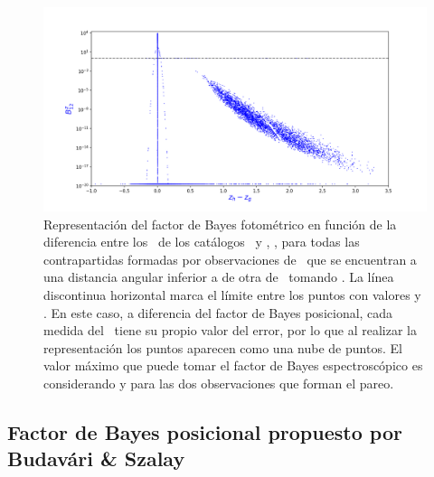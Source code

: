 \begin{figure}[H]
    \begin{center}
         \includegraphics[width=\textwidth]{4_cross_identificacion/matching_ghbayes_zmatching_gh.png}
    \end{center}
    \vspace*{-10mm}
    \caption{\small Representación del factor de Bayes fotométrico en función de la diferencia entre los \rt\ de los catálogos \hatlas\ y \gama,  , para todas las contrapartidas formadas por observaciones de \hatlas\ que se encuentran a una distancia angular inferior a  de otra de \gama\ tomando . La línea discontinua horizontal marca el límite entre los puntos con valores  y . En este caso, a diferencia del factor de Bayes posicional, cada medida del \rt\ tiene su propio valor del error, por lo que al realizar la representación los puntos aparecen como una nube de puntos. El valor máximo que puede tomar el factor de Bayes espectroscópico es  considerando  y  para las dos observaciones que forman el pareo.}
    \label{fig:bayes_fotométrico}
\end{figure}


\subsection{Factor de Bayes posicional propuesto por Budavári \& Szalay}\label{sec:bayes_posicional}

